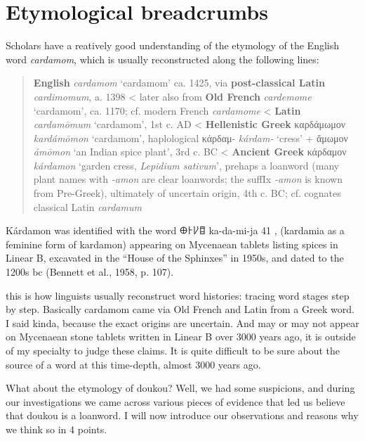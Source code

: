 \documentclass[12pt]{article}
\begin{document}
\section{Etymological breadcrumbs}\label{sec:etymology}

Scholars have a reatively good understanding of the etymology of the English word \textit{cardamom}, which is usually reconstructed along the following lines:

\begin{quote}
    \textbf{English} \textit{cardamom} `cardamom' ca. 1425, via \textbf{post-classical Latin} \textit{cardimomum}, a. 1398
    < later also from \textbf{Old French} \textit{cardemome} `cardamom', ca. 1170; cf. modern French \textit{cardamome}
    < \textbf{Latin} \textit{cardamōmum} `cardamom', 1st c. AD
    < \textbf{Hellenistic Greek} {καρδάμωμον} \textit{kardámōmon} `cardamom', haplological κάρδαμ- \textit{kárdam-} `cress' + ἄμωμον \textit{ámōmon} `an Indian spice plant', 3rd c. BC
    < \textbf{Ancient Greek} {κάρδαμον} \textit{kárdamon} `garden cress, \textit{Lepidium sativum}', prehaps a loanword (many plant names with \textit{-amon} are clear loanwords; the suffIx \textit{-amon} is known from Pre-Greek), ultimately of uncertain origin, 4th c. BC; cf. cognates classical Latin \textit{cardamum}
    \parencites[s.v. cardamom]{oed}[s.v. cardamome]{tlfi}[s.v. cardamomum]{lewis_1879_latin}[s.v. καρδάμωμον]{liddell_1940_greekenglish}[s.v. κάρδαμον]{liddell_1940_greekenglish}[644]{beekes_2010_etymological}
\end{quote}

Kárdamon was identified with the word 𐀏𐀅𐀖𐀊 ka-da-mi-ja 41 , (kardamia as a feminine form of kardamon) appearing on Mycenaean tablets listing spices in Linear B, excavated in the “House of the Sphinxes” in 1950s, and dated to the 1200s bc (Bennett et al., 1958, p. 107).



this is how linguists usually reconstruct word histories: tracing word stages step by step. Basically cardamom came via Old French and Latin from a Greek word. I said kinda, because the exact origins are uncertain. And may or may not appear on Mycenaean stone tablets written in Linear B over 3000 years ago, it is outside of my specialty to judge these claims. It is quite difficult to be sure about the source of a word at this time-depth, almost 3000 years ago.

What about the etymology of doukou? Well, we had some suspicions, and during our investigations we came across various pieces of evidence that led us believe that doukou is a loanword. I will now introduce our observations and reasons why we think so in 4 points.
\end{document}
